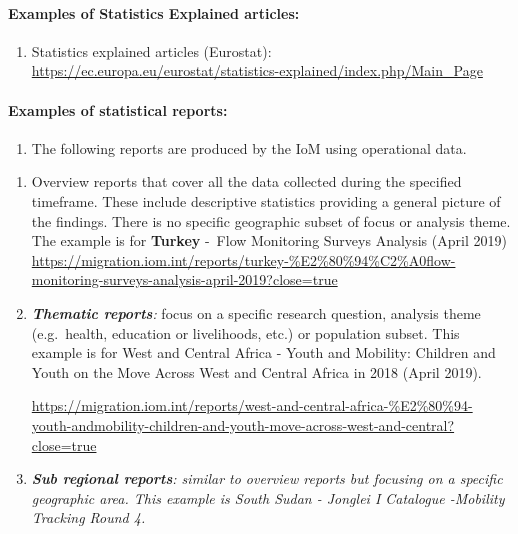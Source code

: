 \documentclass[
]{article}
\providecommand{\tightlist}{%
  \setlength{\itemsep}{0pt}\setlength{\parskip}{0pt}}
\begin{document}
\hypertarget{examples-of-statistics-explained-articles}{%
\paragraph{Examples of Statistics Explained articles:}\label{examples-of-statistics-explained-articles}}

\begin{enumerate}
\def\labelenumi{\arabic{enumi}.}
\setcounter{enumi}{512}
\tightlist
\item
  Statistics explained articles (Eurostat):
  \url{https://ec.europa.eu/eurostat/statistics-explained/index.php/Main_Page}
\end{enumerate}

\hypertarget{examples-of-statistical-reports}{%
\paragraph{Examples of statistical reports:}\label{examples-of-statistical-reports}}

\begin{enumerate}
\def\labelenumi{\arabic{enumi}.}
\setcounter{enumi}{513}
\tightlist
\item
  The following reports are produced by the IoM using operational
  data.
\end{enumerate}

\begin{enumerate}
\def\labelenumi{\roman{enumi}.}
\item
  Overview reports that cover all the data collected during the
  specified timeframe. These include descriptive statistics providing
  a general picture of the findings. There is no specific geographic
  subset of focus or analysis theme. The example is for \textbf{Turkey}
  -~{Flow Monitoring Surveys Analysis (April 2019})
  \url{https://migration.iom.int/reports/turkey-\%E2\%80\%94\%C2\%A0flow-monitoring-surveys-analysis-april-2019?close=true}
\item
  \emph{\textbf{Thematic reports}:} focus on a specific research question,
  analysis theme (e.g.~health, education or livelihoods, etc.) or
  population subset. This example is for {West and Central Africa -
  Youth and Mobility: Children and Youth on the Move Across West and
  Central Africa in 2018} (April 2019).

  \url{https://migration.iom.int/reports/west-and-central-africa-\%E2\%80\%94-youth-andmobility-children-and-youth-move-across-west-and-central?close=true}
\item
  \emph{\textbf{Sub regional reports}: similar to overview reports but focusing
  on a specific geographic area. This example is {South Sudan -
  Jonglei I Catalogue -Mobility Tracking Round 4.}}
\end{enumerate}
\end{document}
